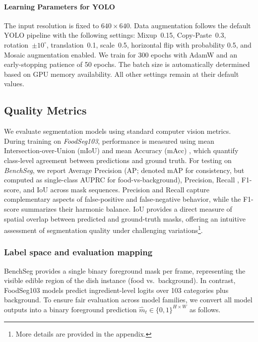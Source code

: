 \documentclass[preprint,12pt]{elsarticle}
\begin{document}
\paragraph{Learning Parameters for YOLO}
\label{par:learn-yolo} 
The input resolution is fixed to $640\times640$. Data augmentation follows the default YOLO pipeline with the following settings: Mixup~0.15, Copy-Paste~0.3, rotation~$\pm 10^\circ$, translation~0.1, scale~0.5, horizontal flip with probability 0.5, and Mosaic augmentation enabled. We train for 300 epochs with AdamW and an early-stopping patience of 50 epochs. The batch size is automatically determined based on GPU memory availability. All other settings remain at their default values.



\subsection{Quality Metrics}
We evaluate segmentation models using standard computer vision metrics.
During training on \textit{FoodSeg103}, performance is measured using mean Intersection-over-Union (mIoU) \cite{everingham2010pascal} and mean Accuracy (mAcc) \cite{long2015fully}, which quantify class-level agreement between predictions and ground truth. 
For testing on \textit{BenchSeg}, we report Average Precision (AP; denoted mAP for consistency, but computed as single-class AUPRC for food-vs-background), Precision, Recall \cite{papadopoulos2017training}, F1-score, and IoU across mask sequences. Precision and Recall capture complementary aspects of false-positive and false-negative behavior, while the F1-score summarizes their harmonic balance. IoU provides a direct measure of spatial overlap between predicted and ground-truth masks, offering an intuitive assessment of segmentation quality under challenging variations\footnote{\label{more_det} More details are provided in the appendix.}. 

\subsubsection{Label space and evaluation mapping}
\label{sec:label_mapping}

BenchSeg provides a single binary foreground mask per frame, representing the visible edible region of the dish instance (food vs.\ background). In contrast, FoodSeg103 models predict ingredient-level logits over 103 categories plus background. To ensure fair evaluation across model families, we convert all model outputs into a binary foreground prediction $\hat m_t \in \{0,1\}^{H\times W}$ as follows.
\end{document}
